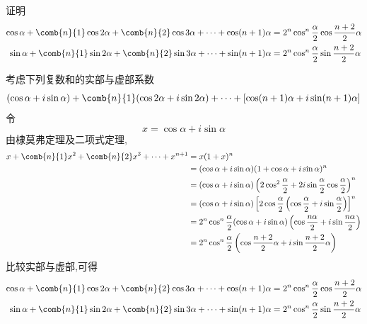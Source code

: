 \begin{questions}
    \question 证明
    \begin{align*}
    \cos \alpha + \comb{n}{1} \cos 2\alpha + \comb{n}{2} \cos 3\alpha + \dots + \cos (n + 1)\alpha &= 2^n \cos^n \frac{\alpha}{2} \cos \frac{n+2}{2} \alpha \\
    \sin \alpha + \comb{n}{1} \sin 2\alpha + \comb{n}{2} \sin 3\alpha + \dots + \sin (n + 1)\alpha &= 2^n \cos^n \frac{\alpha}{2} \sin \frac{n+2}{2} \alpha
    \end{align*}
    \begin{solution}
        考虑下列复数和的实部与虚部系数
        \[ 
        (\cos \alpha + i \sin \alpha) + \comb{n}{1}(\cos 2\alpha + i \sin 2\alpha) + \dots + [\cos (n + 1)\alpha + i \sin (n + 1)\alpha] 
        \]
        令 
        \[
        x = \cos \alpha + i \sin \alpha
        \]
        由棣莫弗定理及二项式定理,
        \begin{align*}
        x + \comb{n}{1} x^2 + \comb{n}{2} x^3 + \dots + x^{n+1} &= x(1 + x)^n \\
        &= (\cos \alpha + i \sin \alpha)(1 + \cos \alpha + i \sin \alpha)^n \\
        &= (\cos \alpha + i \sin \alpha)\left(2\cos^2 \frac{\alpha}{2} + 2i \sin \frac{\alpha}{2} \cos \frac{\alpha}{2}\right)^n \\
        &= (\cos \alpha + i \sin \alpha) \left[ 2\cos \frac{\alpha}{2} \left(\cos \frac{\alpha}{2} + i \sin \frac{\alpha}{2}\right) \right]^n \\
        &= 2^n \cos^n \frac{\alpha}{2} (\cos \alpha + i \sin \alpha)\left(\cos \frac{n\alpha}{2} + i \sin \frac{n\alpha}{2}\right) \\
        &= 2^n \cos^n \frac{\alpha}{2} \left(\cos \frac{n+2}{2} \alpha + i \sin \frac{n+2}{2} \alpha\right)
        \end{align*}
        比较实部与虚部,可得
        \begin{align*}
        \cos \alpha + \comb{n}{1} \cos 2\alpha + \comb{n}{2} \cos 3\alpha + \dots + \cos (n + 1)\alpha &= 2^n \cos^n \frac{\alpha}{2} \cos \frac{n+2}{2} \alpha \\
        \sin \alpha + \comb{n}{1} \sin 2\alpha + \comb{n}{2} \sin 3\alpha + \dots + \sin (n + 1)\alpha &= 2^n \cos^n \frac{\alpha}{2} \sin \frac{n+2}{2} \alpha
        \end{align*}
    \end{solution}

    \question
    \begin{parts}

\end{parts}
\end{questions}
